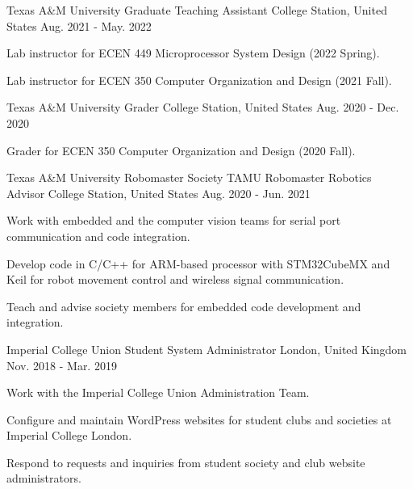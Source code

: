 
\begin{cventries}
  \cventry
    {Texas A\&M University} %
    {Graduate Teaching Assistant} %
    {College Station, United States} %
    {Aug. 2021 - May. 2022} %
    {
      \begin{cvitems} %
        \item {Lab instructor for ECEN 449 Microprocessor System Design (2022 Spring).}
        \item {Lab instructor for ECEN 350 Computer Organization and Design (2021 Fall).}
      \end{cvitems}
    }
    
  \cventry
    {Texas A\&M University} %
    {Grader} %
    {College Station, United States} %
    {Aug. 2020 - Dec. 2020} %
    {
      \begin{cvitems} %
        \item {Grader for ECEN 350 Computer Organization and Design (2020 Fall).}
      \end{cvitems}
    }
    
  \cventry
    {Texas A\&M University Robomaster Society} %
    {TAMU Robomaster Robotics Advisor} %
    {College Station, United States} %
    {Aug. 2020 - Jun. 2021} %
    {
      \begin{cvitems} %
        \item {Work with embedded and the computer vision teams for serial port communication and code integration.}
        \item {Develop code in C/C++ for ARM-based processor with STM32CubeMX and Keil for robot movement control and wireless signal communication.}
        \item {Teach and advise society members for embedded code development and integration.}
      \end{cvitems}
    }

  \cventry
    {Imperial College Union} %
    {Student System Administrator} %
    {London, United Kingdom} %
    {Nov. 2018 - Mar. 2019} %
    {
      \begin{cvitems} %
        \item {Work with the Imperial College Union Administration Team.}
        \item {Configure and maintain WordPress websites for student clubs and societies at Imperial College London.}
        \item {Respond to requests and inquiries from student society and club website administrators.}
      \end{cvitems}
    }


\end{cventries}
